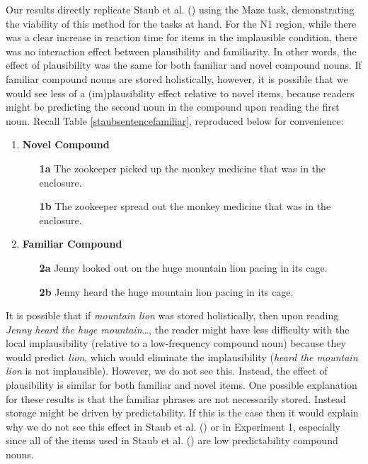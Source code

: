 \documentclass[
  12pt,
  letterpaper,
]{scrreprt}
\begin{document}
Our results directly replicate Staub et al.
() using the Maze
task, demonstrating the viability of this method for the tasks at hand.
For the N1 region, while there was a clear increase in reaction time for
items in the implausible condition, there was no interaction effect
between plausibility and familiarity. In other words, the effect of
plausibility was the same for both familiar and novel compound nouns. If
familiar compound nouns are stored holistically, however, it is possible
that we would see less of a (im)plausibility effect relative to novel
items, because readers might be predicting the second noun in the
compound upon reading the first noun. Recall Table
\ref{staubsentencefamiliar}, reproduced below for convenience:

\begin{enumerate}
   \item \textbf{Novel Compound}
    \begin{enumerate}
        \item[\textbf{1a}] The zookeeper picked up the monkey medicine that was in the enclosure.
        \item[\textbf{1b}] The zookeeper spread out the monkey medicine that was in the enclosure.
    \end{enumerate} \label{staubsentencenovel}
    \item \textbf{Familiar Compound}
    \begin{enumerate}
        \item[\textbf{2a}] Jenny looked out on the huge mountain lion pacing in its cage. \label{familiarplaus}
        \item[\textbf{2b}] Jenny heard the huge mountain lion pacing in its cage. \label{familiarimplaus}
    \end{enumerate} \label{figanext}
\end{enumerate}

It is possible that if \emph{mountain lion} was stored holistically,
then upon reading \emph{Jenny heard the huge mountain\ldots{}}, the
reader might have less difficulty with the local implausibility
(relative to a low-frequency compound noun) because they would predict
\emph{lion}, which would eliminate the implausibility (\emph{heard the
mountain lion} is not implausible). However, we do not see this.
Instead, the effect of plausibility is similar for both familiar and
novel items. One possible explanation for these results is that the
familiar phrases are not necessarily stored. Instead storage might be
driven by predictability. If this is the case then it would explain why
we do not see this effect in Staub et al.
() or in Experiment
1, especially since all of the items used in Staub et al.
() are low
predictability compound nouns.
\end{document}
